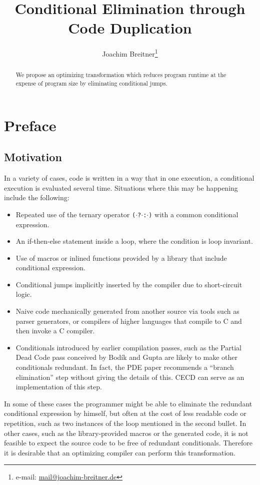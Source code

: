 \documentclass[halfparskip]{scrartcl}
\author{Joachim Breitner\footnote{e-mail: \href{mailto:mail@joachim-breitner.de}{mail@joachim-breitner.de}}}
\title{Conditional Elimination through Code Duplication}
\begin{document}
\maketitle

\begin{abstract}
We propose an optimizing transformation which reduces program runtime at the expense of program size by eliminating conditional jumps.
\end{abstract}



\section{Preface}

\subsection{Motivation}

In a variety of cases, code is written in a way that in one execution, a conditional execution is evaluated several time. Situations where this may be happening include the following:

\begin{itemize}
\item Repeated use of the ternary operator \texttt{($\cdot$?$\cdot$:$\cdot$)} with a common conditional expression.
\item An if-then-else statement inside a loop, where the condition is loop invariant.
\item Use of macros or inlined functions provided by a library that include conditional expression.
\item Conditional jumps implicitly inserted by the compiler due to short-circuit logic.
\item Naive code mechanically generated from another source via tools such as parser generators, or compilers of higher languages that compile to C and then invoke a C compiler.
\item Conditionals introduced by earlier compilation passes, such as the Partial Dead Code pass conceived by Bodík and Gupta \citep{PDE} are likely to make other conditionals redundant. In fact, the PDE paper recommends a “branch elimination” step without giving the details of this. CECD can serve as an implementation of this step.
\end{itemize}

In some of these cases the programmer might be able to eliminate the redundant conditional expression by himself, but often at the cost of less readable code or repetition, such as two instances of the loop mentioned in the second bullet. In other cases, such as the library-provided macros or the generated code, it is not feasible to expect the source code to be free of redundant conditionals. Therefore it is desirable that an optimizing compiler can perform this transformation.
\end{document}
